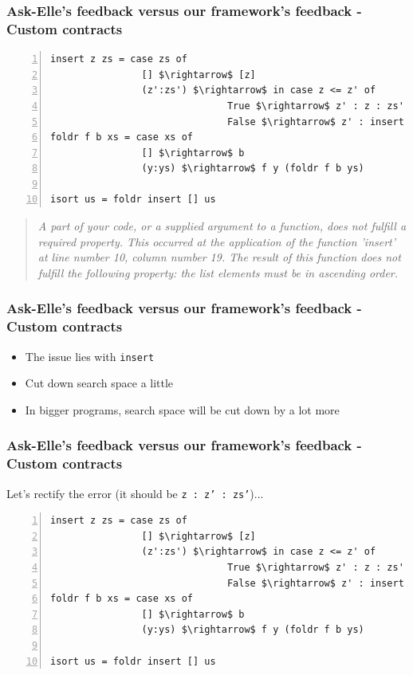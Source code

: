 \documentclass[]{beamer}
\begin{document}
\begin{frame}[fragile]
\frametitle{Ask-Elle's feedback versus our framework's feedback - Custom contracts}

\begin{lstlisting}[mathescape,numbers=left]
insert z zs = case zs of
                [] $\rightarrow$ [z]
                (z':zs') $\rightarrow$ in case z <= z' of
                               True $\rightarrow$ z' : z : zs'
                               False $\rightarrow$ z' : insert z zs'
foldr f b xs = case xs of
                [] $\rightarrow$ b
                (y:ys) $\rightarrow$ f y (foldr f b ys)
                
isort us = foldr insert [] us
\end{lstlisting}

\begin{quote}
\textit{A part of your code, or a supplied argument to a function, does not fulfill a required property. This occurred at the application of the function 'insert' at line number 10, column number 19. The result of this function does not fulfill the following property: the list elements must be in ascending order.}
\end{quote}

\end{frame}

\begin{frame}[fragile]
\frametitle{Ask-Elle's feedback versus our framework's feedback - Custom contracts}

\begin{itemize}
	\item The issue lies with \texttt{insert}
	\item Cut down search space a little
	\item In bigger programs, search space will be cut down by a lot more
\end{itemize}

\end{frame}

\begin{frame}[fragile]
\frametitle{Ask-Elle's feedback versus our framework's feedback - Custom contracts}

Let's rectify the error (it should be \texttt{z : z' : zs'})...

\begin{lstlisting}[mathescape,numbers=left]
insert z zs = case zs of
                [] $\rightarrow$ [z]
                (z':zs') $\rightarrow$ in case z <= z' of
                               True $\rightarrow$ z' : z : zs'
                               False $\rightarrow$ z' : insert z zs'
foldr f b xs = case xs of
                [] $\rightarrow$ b
                (y:ys) $\rightarrow$ f y (foldr f b ys)
                
isort us = foldr insert [] us
\end{lstlisting}

\end{frame}
\end{document}
